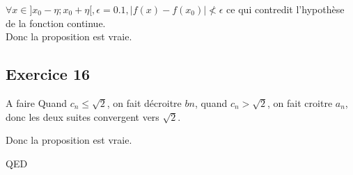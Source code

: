 \documentclass[]{book}
\theoremstyle{definition}
\begin{document}
$\forall x \in ]x_0 - \eta;x_0 + \eta[, \epsilon = 0.1, |f(x) - f(x_0)| \nless \epsilon$ ce qui contredit l'hypoth\`ese de la fonction continue.\\

Donc la proposition est vraie.

\subsection*{Exercice 16}
A faire
Quand $c_n \le \sqrt{2}$, on fait d\'ecroitre $bn$, quand $c_n > \sqrt{2}$, on fait croitre $a_n$, donc les deux suites convergent vers $\sqrt{2}$.

Donc la proposition est vraie.

QED
\end{document}
